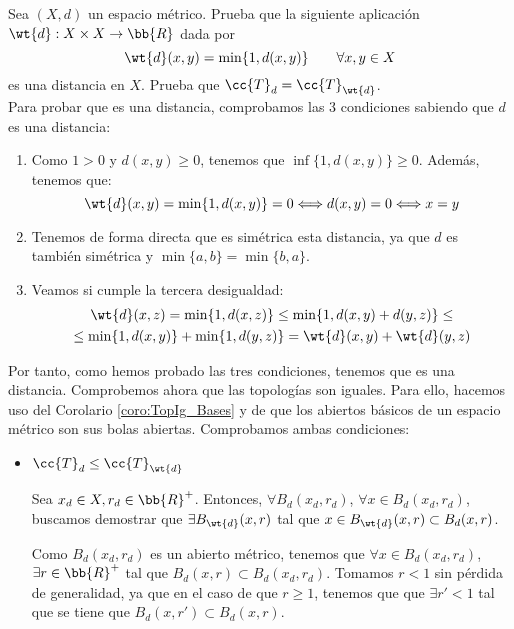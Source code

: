 \begin{ejercicio}
    Sea $(X,d)$ un espacio métrico. Prueba que la siguiente aplicación $\wt{d}:X\times X\to \bb{R}$ dada por
    \begin{equation*}
        \wt{d}(x,y)=\min\{1,d(x,y)\} \qquad \forall x,y\in X
    \end{equation*}
    es una distancia en $X$. Prueba que $\cc{T}_d=\cc{T}_{\wt{d}}$.\\

    Para probar que es una distancia, comprobamos las 3 condiciones sabiendo que $d$ es una distancia:
    \begin{enumerate}
        \item Como $1>0$ y $d(x,y)\geq 0$, tenemos que $\inf\{1,d(x,y)\}\geq 0$. Además, tenemos que:
        \begin{equation*}
            \wt{d}(x,y)=\min\{1,d(x,y)\} = 0 \Longleftrightarrow d(x,y)=0 \Longleftrightarrow x=y
        \end{equation*}

        \item Tenemos de forma directa que es simétrica esta distancia, ya que $d$ es también simétrica y $\min\{a,b\}=\min\{b,a\}$.

        \item Veamos si cumple la tercera desigualdad:
        \begin{multline*}
            \wt{d}(x,z) = \min\{1,d(x,z)\} \leq \min\{1,d(x,y)+d(y,z)\} \leq \\\leq \min\{1,d(x,y)\}  + \min\{1,d(y,z)\} = \wt{d}(x,y) +  \wt{d}(y,z)
        \end{multline*}
    \end{enumerate}

    Por tanto, como hemos probado las tres condiciones, tenemos que es una distancia. Comprobemos ahora que las topologías son iguales. Para ello, hacemos uso del Corolario \ref{coro:TopIg_Bases} y de que los abiertos básicos de un espacio métrico son sus bolas abiertas. Comprobamos ambas condiciones:
    \begin{itemize}
        \item \ul{$\cc{T}_d\leq \cc{T}_{\wt{d}}$}

        Sea $x_d\in X, r_d\in \bb{R}^+$. Entonces, $\forall B_d(x_d,r_d)$, $\forall x\in B_d(x_d,r_d)$, buscamos demostrar que $\exists B_{\wt{d}}(x,r)$ tal que $x\in B_{\wt{d}}(x,r)\subset B_d(x,r)$.

        Como $B_d(x_d,r_d)$ es un abierto métrico, tenemos que $\forall x\in B_d(x_d,r_d)$, $\exists r\in \bb{R}^+$ tal que $B_d(x,r)\subset B_d(x_d,r_d)$. Tomamos $r<1$ sin pérdida de generalidad, ya que en el caso de que $r\geq 1$, tenemos que que $\exists r'<1$ tal que se tiene que $B_d(x,r')\subset B_d(x,r)$.


\end{itemize}
\end{ejercicio}
